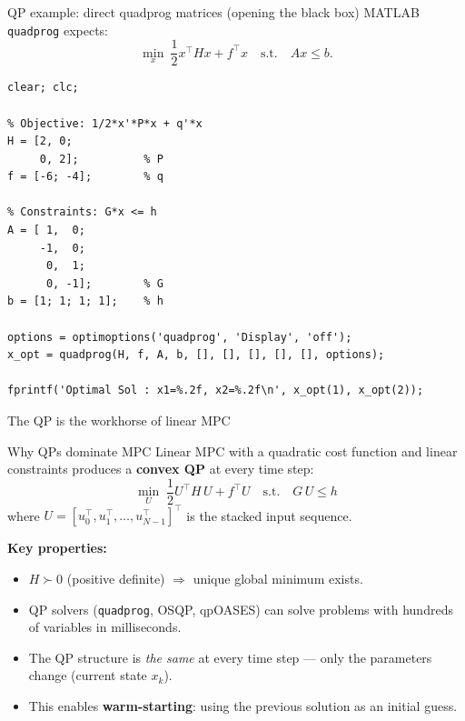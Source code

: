 \documentclass[aspectratio=169,10pt]{beamer}
\begin{document}
\begin{frame}[fragile]{QP example: direct quadprog matrices (opening the black box)}
MATLAB \texttt{quadprog} expects:
\begin{equation*}
\min_x\ \frac{1}{2}x^\top Hx + f^\top x\quad \text{s.t.}\quad Ax\le b.
\end{equation*}

\begin{lstlisting}[caption={Direct solution using MATLAB's quadprog.}]
clear; clc;

% Objective: 1/2*x'*P*x + q'*x
H = [2, 0;
     0, 2];          % P
f = [-6; -4];        % q

% Constraints: G*x <= h
A = [ 1,  0;
     -1,  0;
      0,  1;
      0, -1];        % G
b = [1; 1; 1; 1];    % h

options = optimoptions('quadprog', 'Display', 'off');
x_opt = quadprog(H, f, A, b, [], [], [], [], [], options);

fprintf('Optimal Sol : x1=%.2f, x2=%.2f\n', x_opt(1), x_opt(2));
\end{lstlisting}
\end{frame}

\begin{frame}{The QP is the workhorse of linear MPC}
\begin{defnbox}{Why QPs dominate MPC}
Linear MPC with a quadratic cost function and linear constraints produces a \textbf{convex QP} at every time step:
\[
\min_{U} \; \frac{1}{2} U^\top H\, U + f^\top U \quad \text{s.t.} \quad G\, U \le h
\]
where $U = [u_0^\top, u_1^\top, \dots, u_{N-1}^\top]^\top$ is the stacked input sequence.
\end{defnbox}

\vspace{0.3em}
\textbf{Key properties:}
\begin{itemize}
  \item $H \succ 0$ (positive definite) $\Rightarrow$ unique global minimum exists.
  \item QP solvers (\texttt{quadprog}, OSQP, qpOASES) can solve problems with hundreds of variables in milliseconds.
  \item The QP structure is \emph{the same} at every time step --- only the parameters change (current state $x_k$).
  \item This enables \textbf{warm-starting}: using the previous solution as an initial guess.
\end{itemize}
\end{frame}
\end{document}
